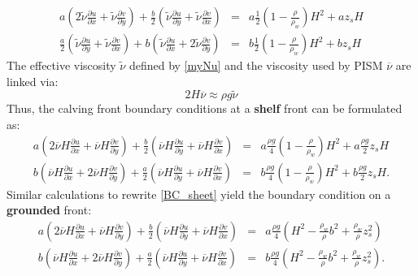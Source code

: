 \documentclass[a4paper,10pt]{article}
\begin{document}
\begin{eqnarray*}
a\left(2\tilde{\nu}\frac{\partial u}{\partial x}+\tilde{\nu}\frac{\partial v}{\partial y}  \right) + \frac{b}{2} \left(\tilde{\nu}\frac{\partial u}{\partial y} + \tilde{\nu}\frac{\partial v}{\partial x} \right) & =  & a\frac{1}{2}\left(1-\frac{\rho}{\rho_w}\right)H^2 + az_sH \\  
\frac{a}{2} \left(\tilde{\nu}\frac{\partial u}{\partial y} + \tilde{\nu}\frac{\partial v}{\partial x} \right) + b\left(\tilde{\nu}\frac{\partial u}{\partial x}+2\tilde{\nu}\frac{\partial v}{\partial y}  \right) & = & b\frac{1}{2}\left(1-\frac{\rho}{\rho_w}\right)H^2 + bz_sH 
\end{eqnarray*}
The effective viscosity $\tilde{\nu}$ defined by \eqref{myNu} and the viscosity used by PISM $\overline{\nu}$ are linked via:
\begin{equation*}%
2H\overline\nu\approx\rho g\tilde{\nu}
\label{nuLink}
\end{equation*}
Thus, the calving front boundary conditions at a \textbf{shelf} front can be formulated as:
\begin{eqnarray}%
a\left(2\overline{\nu}H\frac{\partial u}{\partial x}+\overline{\nu}H\frac{\partial v}{\partial y}  \right) + \frac{b}{2} \left(\overline{\nu}H\frac{\partial u}{\partial y} + \overline{\nu}H\frac{\partial v}{\partial x} \right) & =  & a\frac{\rho g}{4}\left(1-\frac{\rho}{\rho_w}\right)H^2 + a\frac{\rho g}{2}z_sH \label{calv_BC1}\\  
 b\left(\overline{\nu}H\frac{\partial u}{\partial x}+2\overline{\nu}H\frac{\partial v}{\partial y}  \right) + \frac{a}{2} \left(\overline{\nu}H\frac{\partial u}{\partial y} + \overline{\nu}H\frac{\partial v}{\partial x} \right) & = & b\frac{\rho g}{4}\left(1-\frac{\rho}{\rho_w}\right)H^2 + b\frac{\rho g}{2}z_sH. \label{calv_BC2}
\end{eqnarray}
Similar calculations to rewrite \eqref{BC_sheet} yield the boundary condition on a \textbf{grounded} front:
\begin{eqnarray}%
a\left(2\overline{\nu}H\frac{\partial u}{\partial x}+\overline{\nu}H\frac{\partial v}{\partial y}  \right) + \frac{b}{2} \left(\overline{\nu}H\frac{\partial u}{\partial y} + \overline{\nu}H\frac{\partial v}{\partial x} \right) & =  & a\frac{\rho g}{4}\left(H^2-\frac{\rho_w}{\rho}b^2+\frac{\rho_w}{\rho}z_s^2  \right) \label{sheet_BC1}\\  
 b\left(\overline{\nu}H\frac{\partial u}{\partial x}+2\overline{\nu}H\frac{\partial v}{\partial y}  \right) + \frac{a}{2} \left(\overline{\nu}H\frac{\partial u}{\partial y} + \overline{\nu}H\frac{\partial v}{\partial x} \right) & = & b\frac{\rho g}{4}\left(H^2-\frac{\rho_w}{\rho}b^2+\frac{\rho_w}{\rho}z_s^2 \right). \label{sheet_BC2}
\end{eqnarray}
\end{document}
